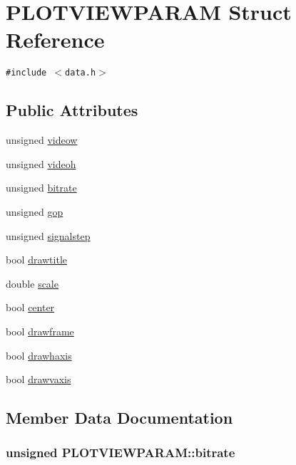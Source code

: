 \hypertarget{struct_p_l_o_t_v_i_e_w_p_a_r_a_m}{
\section{PLOTVIEWPARAM Struct Reference}
\label{struct_p_l_o_t_v_i_e_w_p_a_r_a_m}
}
{\tt \#include $<$data.h$>$}

\subsection*{Public Attributes}
\begin{CompactItemize}
\item 
unsigned \hyperlink{struct_p_l_o_t_v_i_e_w_p_a_r_a_m_b033c45c1fea368d6bd06a61b33e5b0a}{videow}
\item 
unsigned \hyperlink{struct_p_l_o_t_v_i_e_w_p_a_r_a_m_536e1df50bf3d400fb99b4e54e87613a}{videoh}
\item 
unsigned \hyperlink{struct_p_l_o_t_v_i_e_w_p_a_r_a_m_ef7d04ce65fbdd35288ffbc067a5d798}{bitrate}
\item 
unsigned \hyperlink{struct_p_l_o_t_v_i_e_w_p_a_r_a_m_c23a43d5e164e2b9646ebcb6dea4b83e}{gop}
\item 
unsigned \hyperlink{struct_p_l_o_t_v_i_e_w_p_a_r_a_m_dc087da1d2f3036ad7b218995873a448}{signalstep}
\item 
bool \hyperlink{struct_p_l_o_t_v_i_e_w_p_a_r_a_m_79e676cabb3623a5e83bd1bc96febd33}{drawtitle}
\item 
double \hyperlink{struct_p_l_o_t_v_i_e_w_p_a_r_a_m_57c57129bc0151bb9cc8040e9b9c5d51}{scale}
\item 
bool \hyperlink{struct_p_l_o_t_v_i_e_w_p_a_r_a_m_f8bb4b7a3ebf5cb66749a3f95be3d762}{center}
\item 
bool \hyperlink{struct_p_l_o_t_v_i_e_w_p_a_r_a_m_079a5418200faa4f213dfc5606b97221}{drawframe}
\item 
bool \hyperlink{struct_p_l_o_t_v_i_e_w_p_a_r_a_m_befb2dc38a80f3facb0fd3771d1b1668}{drawhaxis}
\item 
bool \hyperlink{struct_p_l_o_t_v_i_e_w_p_a_r_a_m_be384cd71f0cd2acaf4581b39f95366e}{drawvaxis}
\end{CompactItemize}


\subsection{Member Data Documentation}
\hypertarget{struct_p_l_o_t_v_i_e_w_p_a_r_a_m_ef7d04ce65fbdd35288ffbc067a5d798}{
\subsubsection[{bitrate}]{\setlength{\rightskip}{0pt plus 5cm}unsigned {\bf PLOTVIEWPARAM::bitrate}}}
\label{struct_p_l_o_t_v_i_e_w_p_a_r_a_m_ef7d04ce65fbdd35288ffbc067a5d798}


